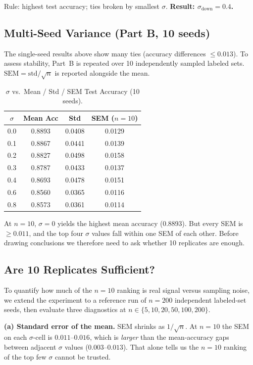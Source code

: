 \documentclass[11pt]{article}
\begin{document}
Rule: highest test accuracy; ties broken by smallest $\sigma$. \quad
\textbf{Result: $\sigma_{\text{down}} = 0.4$.}

\subsection{Multi-Seed Variance (Part B, 10 seeds)}
The single-seed results above show many ties (accuracy differences
$\leq 0.013$). To assess stability, Part~B is repeated over 10 independently
sampled labeled sets. $\mathrm{SEM} = \mathrm{std}/\sqrt{n}$ is reported
alongside the mean.

\begin{table}[h]
\centering
\begin{tabular}{cccc}
\toprule
$\sigma$ & Mean Acc & Std & SEM ($n{=}10$) \\
\midrule
0.0 & 0.8893 & 0.0408 & 0.0129 \\
0.1 & 0.8867 & 0.0441 & 0.0139 \\
0.2 & 0.8827 & 0.0498 & 0.0158 \\
0.3 & 0.8787 & 0.0433 & 0.0137 \\
0.4 & 0.8693 & 0.0478 & 0.0151 \\
0.6 & 0.8560 & 0.0365 & 0.0116 \\
0.8 & 0.8573 & 0.0361 & 0.0114 \\
\bottomrule
\end{tabular}
\caption{$\sigma$ vs.\ Mean / Std / SEM Test Accuracy (10 seeds).}
\end{table}

At $n{=}10$, $\sigma{=}0$ yields the highest mean accuracy (0.8893). But every
SEM is $\geq 0.011$, and the top four $\sigma$ values fall within one SEM of
each other. Before drawing conclusions we therefore need to ask whether 10
replicates are enough.

\subsection{Are 10 Replicates Sufficient?}
To quantify how much of the $n{=}10$ ranking is real signal versus sampling
noise, we extend the experiment to a reference run of $n{=}200$ independent
labeled-set seeds, then evaluate three diagnostics at
$n \in \{5, 10, 20, 50, 100, 200\}$.

\textbf{(a) Standard error of the mean.} SEM shrinks as $1/\sqrt{n}$. At
$n{=}10$ the SEM on each $\sigma$-cell is $0.011$--$0.016$, which is
\emph{larger} than the mean-accuracy gaps between adjacent $\sigma$ values
($0.003$--$0.013$). That alone tells us the $n{=}10$ ranking of the top few
$\sigma$ cannot be trusted.
\end{document}
